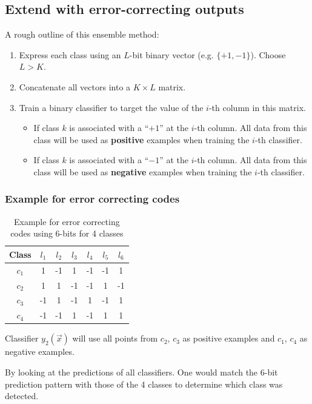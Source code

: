 \subsection{Extend with error-correcting outputs}

\begin{frame}

A rough outline of this ensemble method:

\begin{enumerate}
\item Express each class using an $L$-bit binary vector (e.g. $\{+1,-1\}$). Choose $L>K$.
\item Concatenate all vectors into a $K \times L$ matrix. 
\item Train a binary classifier to target the value of the $i$-th column in this matrix.
    \begin{itemize}
    \item If class $k$ is associated with a ``$+1$'' at the $i$-th column. All data from this class will be used as \textbf{positive} examples when training the $i$-th classifier.
    \item If class $k$ is associated with a ``$-1$'' at the $i$-th column. All data from this class will be used as \textbf{negative} examples when training the $i$-th classifier.
    \end{itemize}
\end{enumerate}
    
\end{frame}

\begin{frame}\frametitle{Example for error correcting codes}

\begin{table}[]
{%
\begin{tabular}{|c|c|c|c|c|c|c|}
\hline
Class & $l_1$ & $l_2$ & $l_3$ & $l_4$ & $l_5$ & $l_6$ \\ \hline\hline
$c_{1}$ & 1 & -1 & 1 & -1 & -1 & 1 \\ \hline
$c_{2}$ & 1 & 1 & -1 & -1 & 1 & -1 \\ \hline
$c_{3}$ & -1 & 1 & -1 & 1 & -1 & 1 \\ \hline
$c_{4}$ & -1 & -1 & 1 & -1 & 1 & 1 \\ \hline
\end{tabular}%
}
\caption{Example for error correcting codes using 6-bits for 4 classes}
\end{table}

Classifier $y_{2}(\vec x)$ will use all points from $c_{2}$, $c_{3}$ as positive examples and $c_{1}$, $c_{4}$ as negative examples.

By looking at the predictions of all classifiers. One would match the $6$-bit prediction pattern with those of the 4 classes to determine which class was detected.

\end{frame}
